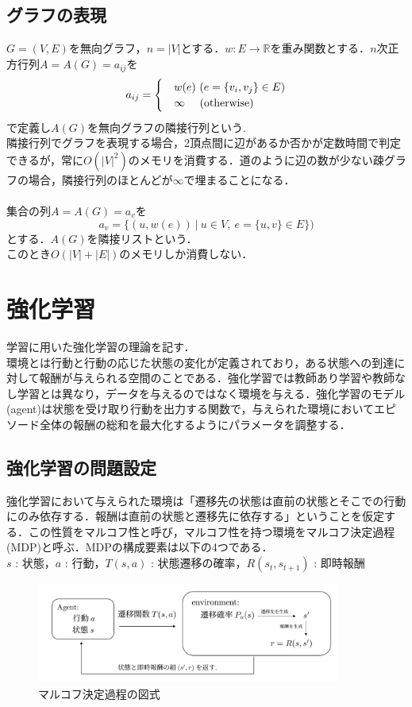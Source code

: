 \documentclass[a4paper,12pt]{jsreport}
\theoremstyle{definition}
\begin{document}
\section{グラフの表現}
$G=(V,E)$を無向グラフ，$n=|V|$とする．$w:E\to \mathbb{R}$を重み関数とする．$n$次正方行列$A=A(G)=a_{ij}$を
\begin{eqnarray}
    a_{ij}=
    \begin{cases}
        & w(e)\ (e=\{v_i,v_j\}\in E)\\
        & \infty\ \ \ \ ({\rm otherwise})
    \end{cases}
\end{eqnarray}
で定義し$A(G)$を無向グラフの隣接行列という.\\
隣接行列でグラフを表現する場合，2頂点間に辺があるか否かが定数時間で判定できるが，常に$O(|V|^2)$のメモリを消費する．道のように辺の数が少ない疎グラフの場合，隣接行列のほとんどが$\infty$で埋まることになる．\\ \\
集合の列$A=A(G)=a_v$を
\begin{equation}
    a_v=\{(u,w(e))\ |\ u\in V,\ e=\{u,v\}\in E \})
\end{equation}
とする．$A(G)$を隣接リストという．\\
このとき$O(|V|+|E|)$のメモリしか消費しない．



\chapter{強化学習}
学習に用いた強化学習の理論を記す．\\
環境とは行動と行動の応じた状態の変化が定義されており，ある状態への到達に対して報酬が与えられる空間のことである．強化学習では教師あり学習や教師なし学習とは異なり，データを与えるのではなく環境を与える．強化学習のモデル(agent)は状態を受け取り行動を出力する関数で，与えられた環境においてエピソード全体の報酬の総和を最大化するようにパラメータを調整する．
\section{強化学習の問題設定} 
強化学習において与えられた環境は「遷移先の状態は直前の状態とそこでの行動にのみ依存する．報酬は直前の状態と遷移先に依存する」ということを仮定する．この性質をマルコフ性と呼び，マルコフ性を持つ環境をマルコフ決定過程(MDP)と呼ぶ．MDPの構成要素は以下の4つである．\\
$s$ : 状態，$a$ : 行動，$T(s,a)$ : 状態遷移の確率，$R(s_t,s_{t+1})$ : 即時報酬\textbf{}
\begin{figure}[h]
    \centering
    \includegraphics[width=10cm]{MDP.png}
    \caption{マルコフ決定過程の図式}
    \label{fig:MDP}
\end{figure}
\clearpage
\end{document}
